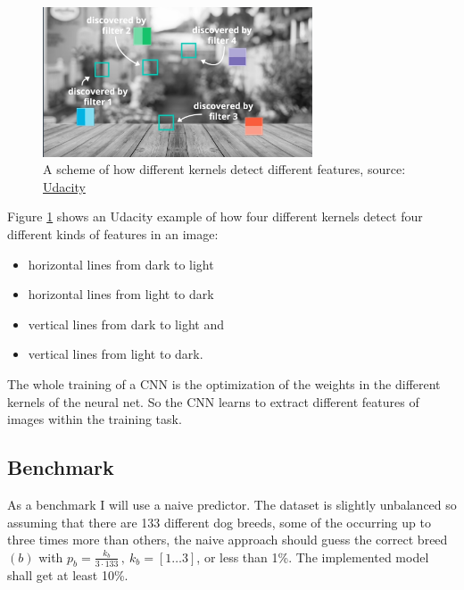 \documentclass[paper=A4, DIV=10, parskip=half]{scrartcl}
\begin{document}
\begin{figure}[H]
  \centering
  \includegraphics[width=8cm]{images/different_kernels.png}
\caption{A scheme of how different kernels detect different features, source:
\href{https://youtu.be/RnM1D-XI--8?t=181}{Udacity}}
  \label{different_kernels}
\end{figure}

Figure \ref{different_kernels} shows an Udacity example of how four different
kernels detect four different kinds of features in an image:
\begin{itemize}
  \item horizontal lines from dark to light
  \item horizontal lines from light to dark
  \item vertical lines from dark to light and
  \item vertical lines from light to dark.
\end{itemize}

The whole training of a CNN is the optimization of the weights in the
different kernels of the neural net. So the CNN learns to extract different
features of images within the training task.


\subsection*{Benchmark}

As a benchmark I will use a naive predictor. The dataset is slightly unbalanced so
assuming that there are 133 different dog breeds, some of the occurring up to three times
more than others, the naive approach should guess the correct breed $(b)$ with
$p_{b}=\frac{k_{b}}{3\cdot133}\,,\:k_{b}=\left[1\ldots3\right]$, or less than 1\%. The
implemented model shall get at least 10\%.

\end{document}
